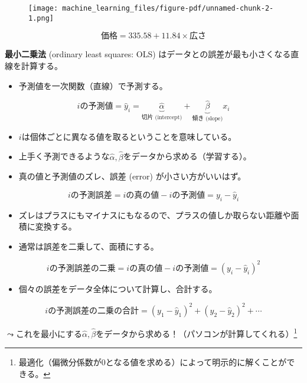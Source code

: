 \documentclass[
  xelatex,
  ja=standard]{bxjsarticle}
\providecommand{\tightlist}{%
  \setlength{\itemsep}{0pt}\setlength{\parskip}{0pt}}\usepackage{longtable,booktabs,array}
\begin{document}
\begin{figure}[htpb]

{\centering \texttt{[image: machine\_learning\_files/figure-pdf/unnamed-chunk-2-1.png]}

}

\end{figure}

\[
\textrm{価格} = 335.58 + 11.84 \times \textrm{広さ}
\]

\textbf{最小二乗法} (ordinary least squares: OLS)
はデータとの誤差が最も小さくなる直線を計算する。

\begin{itemize}
\tightlist
\item
  予測値を一次関数（直線）で予測する。
\end{itemize}

\[
i\textrm{の予測値} = \hat{y}_i = \underbrace{\hat{\alpha}}_{\textrm{切片 (intercept)}} 
+ \underbrace{\hat{\beta}}_{\textrm{傾き (slope)}} x_i
\]

\begin{itemize}
\tightlist
\item
  \(i\)は個体ごとに異なる値を取るということを意味している。
\item
  上手く予測できるような\(\hat{\alpha}, \hat{\beta}\)をデータから求める（学習する）。
\item
  真の値と予測値のズレ、誤差 (error) が小さい方がいいはず。
\end{itemize}

\[
i\textrm{の予測誤差} = i\textrm{の真の値} - i\textrm{の予測値} = y_i - \hat{y}_i
\]

\begin{itemize}
\tightlist
\item
  ズレはプラスにもマイナスにもなるので、プラスの値しか取らない距離や面積に変換する。
\item
  通常は誤差を二乗して、面積にする。
\end{itemize}

\[
i\textrm{の予測誤差の二乗} = i\textrm{の真の値} - i\textrm{の予測値} = (y_i - \hat{y}_i)^2
\]

\begin{itemize}
\tightlist
\item
  個々の誤差をデータ全体について計算し、合計する。
\end{itemize}

\[
i\textrm{の予測誤差の二乗の合計} = (y_1 - \hat{y}_1)^2 + (y_2 - \hat{y}_2)^2 + \cdots
\]

\(\leadsto\)これを最小にする\(\hat{\alpha}, \hat{\beta}\)をデータから求める！（パソコンが計算してくれる）\footnote{最適化（偏微分係数が0となる値を求める）によって明示的に解くことができる。}
\end{document}
